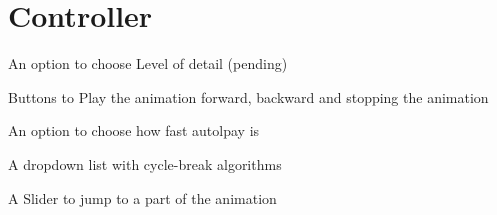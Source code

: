 \section{Controller}

\begin{list}{-}{}
\item An option to choose Level of detail (pending)
\item Buttons to Play the animation forward, backward and stopping the animation
\item An option to choose how fast autolpay is
\item A dropdown list with cycle-break algorithms
\item A Slider to jump to a part of the animation

\end{list}




